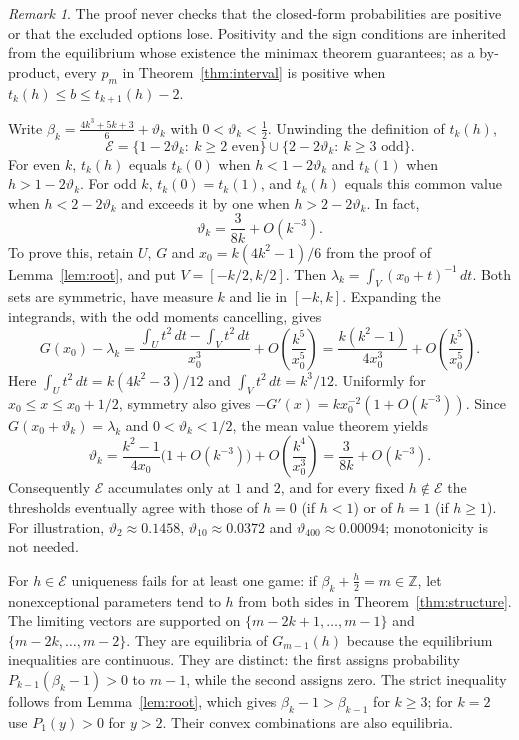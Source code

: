 \documentclass[11pt]{article}
\theoremstyle{definition}
\theoremstyle{remark}
\newtheorem{remark}[theorem]{Remark}
\begin{document}
\begin{remark}\label{rem:exceptional}
The proof never checks that the closed-form probabilities are positive
or that the excluded options lose. Positivity and the sign conditions
are inherited from the equilibrium whose existence the minimax theorem
guarantees; as a by-product, every $p_m$ in Theorem~\ref{thm:interval}
is positive when $t_k(h)\le b\le t_{k+1}(h)-2$.

Write $\beta_k=\frac{4k^3+5k+3}6+\vartheta_k$ with
$0<\vartheta_k<\frac12$. Unwinding the definition of $t_k(h)$,
\[
\mathcal E=\{1-2\vartheta_k:\ k\ge2\text{ even}\}\cup
\{2-2\vartheta_k:\ k\ge3\text{ odd}\}.
\]
For even $k$, $t_k(h)$ equals $t_k(0)$ when $h<1-2\vartheta_k$ and
$t_k(1)$ when $h>1-2\vartheta_k$. For odd $k$, $t_k(0)=t_k(1)$, and
$t_k(h)$ equals this common value when $h<2-2\vartheta_k$ and exceeds it
by one when $h>2-2\vartheta_k$. In fact,
\[
\vartheta_k=\frac3{8k}+O(k^{-3}).
\]
To prove this, retain $U$, $G$ and $x_0=k(4k^2-1)/6$ from the proof of
Lemma~\ref{lem:root}, and put $V=[-k/2,k/2]$. Then
$\lambda_k=\int_V(x_0+t)^{-1}\,dt$. Both sets are symmetric, have
measure $k$ and lie in $[-k,k]$. Expanding the integrands, with the
odd moments cancelling, gives
\[
G(x_0)-\lambda_k
=\frac{\int_Ut^2\,dt-\int_Vt^2\,dt}{x_0^3}
  +O\!\left(\frac{k^5}{x_0^5}\right)
=\frac{k(k^2-1)}{4x_0^3}+O\!\left(\frac{k^5}{x_0^5}\right).
\]
Here $\int_Ut^2\,dt=k(4k^2-3)/12$ and $\int_Vt^2\,dt=k^3/12$.
Uniformly for $x_0\le x\le x_0+1/2$, symmetry also gives
$-G'(x)=kx_0^{-2}(1+O(k^{-3}))$. Since
$G(x_0+\vartheta_k)=\lambda_k$ and $0<\vartheta_k<1/2$, the mean value
theorem yields
\[
\vartheta_k=\frac{k^2-1}{4x_0}\bigl(1+O(k^{-3})\bigr)
  +O\!\left(\frac{k^4}{x_0^3}\right)
=\frac3{8k}+O(k^{-3}).
\]
Consequently $\mathcal E$ accumulates only at $1$ and $2$, and for every
fixed $h\notin\mathcal E$ the thresholds eventually agree with those
of $h=0$ (if $h<1$) or of $h=1$ (if $h\ge1$). For illustration,
$\vartheta_2\approx0.1458$, $\vartheta_{10}\approx0.0372$ and
$\vartheta_{400}\approx0.00094$; monotonicity is not needed.

For $h\in\mathcal E$ uniqueness fails for at least one game: if
$\beta_k+\frac h2=m\in\mathbb Z$, let nonexceptional parameters tend
to $h$ from both sides in Theorem~\ref{thm:structure}. The limiting
vectors are supported on $\{m-2k+1,\dots,m-1\}$ and
$\{m-2k,\dots,m-2\}$. They are equilibria of
$G_{m-1}(h)$ because the equilibrium inequalities are continuous.
They are distinct: the first assigns probability
$P_{k-1}(\beta_k-1)>0$ to $m-1$, while the second assigns zero.
The strict inequality follows from Lemma~\ref{lem:root}, which gives
$\beta_k-1>\beta_{k-1}$ for $k\ge3$; for $k=2$ use
$P_1(y)>0$ for $y>2$. Their convex combinations are also equilibria.
\end{remark}
\end{document}
